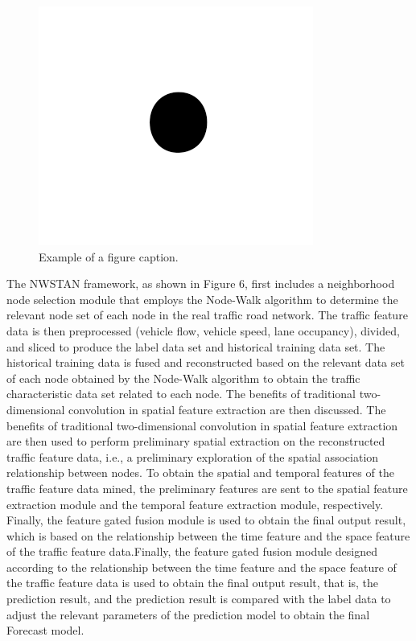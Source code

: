\documentclass[conference]{IEEEtran}
\begin{document}
\begin{figure}[htbp]
    \centerline{\includegraphics{fig1.png}}
    \caption{Example of a figure caption.}
    \label{fig}
\end{figure}

\par
The NWSTAN framework, as shown in Figure 6, first includes a neighborhood node selection module that employs the Node-Walk algorithm to determine the relevant node set of each node in the real traffic road network. The traffic feature data is then preprocessed (vehicle flow, vehicle speed, lane occupancy), divided, and sliced to produce the label data set and historical training data set. The historical training data is fused and reconstructed based on the relevant data set of each node obtained by the Node-Walk algorithm to obtain the traffic characteristic data set related to each node. The benefits of traditional two-dimensional convolution in spatial feature extraction are then discussed. The benefits of traditional two-dimensional convolution in spatial feature extraction are then used to perform preliminary spatial extraction on the reconstructed traffic feature data, i.e., a preliminary exploration of the spatial association relationship between nodes. To obtain the spatial and temporal features of the traffic feature data mined, the preliminary features are sent to the spatial feature extraction module and the temporal feature extraction module, respectively. Finally, the feature gated fusion module is used to obtain the final output result, which is based on the relationship between the time feature and the space feature of the traffic feature data.Finally, the feature gated fusion module designed according to the relationship between the time feature and the space feature of the traffic feature data is used to obtain the final output result, that is, the prediction result, and the prediction result is compared with the label data to adjust the relevant parameters of the prediction model to obtain the final Forecast model.
\end{document}
